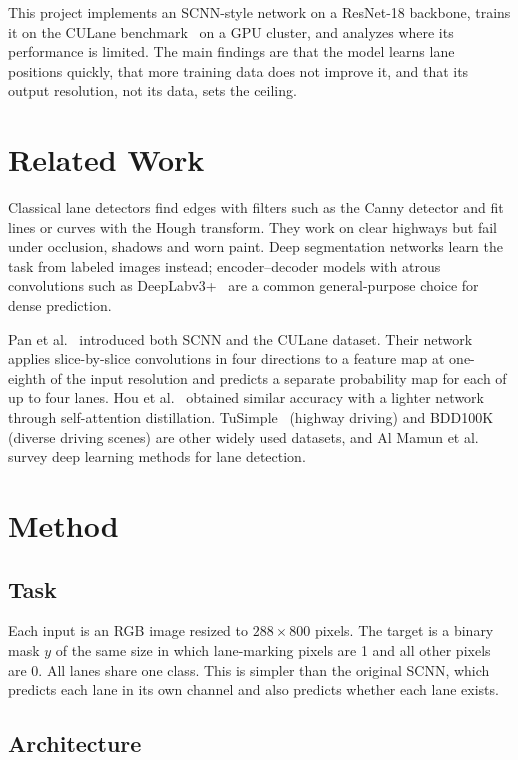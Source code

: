 \documentclass[11pt]{article}
\begin{document}
This project implements an SCNN-style network on a ResNet-18 backbone, trains it on the CULane
benchmark~\cite{pan2018} on a GPU cluster, and analyzes where its performance is limited. The main
findings are that the model learns lane positions quickly, that more training data does not improve
it, and that its output resolution, not its data, sets the ceiling.

\section{Related Work}

Classical lane detectors find edges with filters such as the Canny detector and fit lines or curves
with the Hough transform. They work on clear highways but fail under occlusion, shadows and worn
paint. Deep segmentation networks learn the task from labeled images instead; encoder--decoder
models with atrous convolutions such as DeepLabv3+~\cite{chen2018} are a common general-purpose
choice for dense prediction.

Pan et al.~\cite{pan2018} introduced both SCNN and the CULane dataset. Their network applies
slice-by-slice convolutions in four directions to a feature map at one-eighth of the input
resolution and predicts a separate probability map for each of up to four lanes. Hou et
al.~\cite{hou2019} obtained similar accuracy with a lighter network through self-attention
distillation. TuSimple~\cite{tusimple2017} (highway driving) and BDD100K~\cite{yu2020} (diverse
driving scenes) are other widely used datasets, and Al Mamun et al.~\cite{mamun2022} survey deep
learning methods for lane detection.

\section{Method}

\subsection{Task}

Each input is an RGB image resized to $288\times800$ pixels. The target is a binary mask $y$ of the
same size in which lane-marking pixels are 1 and all other pixels are 0. All lanes share one class.
This is simpler than the original SCNN, which predicts each lane in its own channel and also predicts
whether each lane exists.

\subsection{Architecture}
\end{document}
